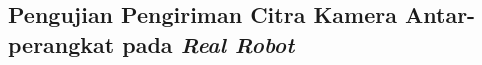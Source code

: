 \subsection{Pengujian Pengiriman Citra Kamera Antar-perangkat pada \emph{Real Robot}}
\label{subsec:citraantarperangkatrobot}

\textcolor{red}{\lipsum[1]}



\textcolor{red}{\lipsum[2]}


